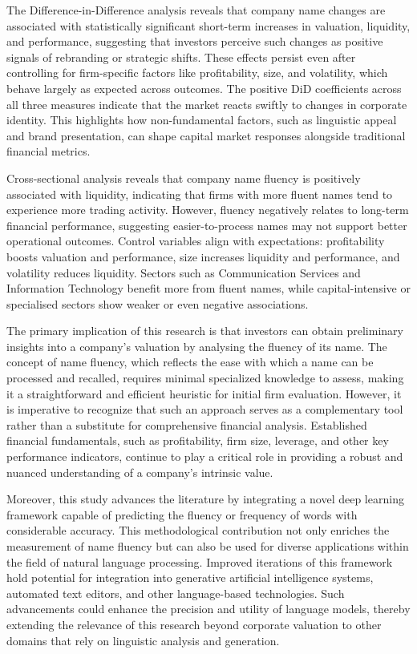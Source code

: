 \documentclass[a4paper,11pt]{report}
\begin{document}
The Difference-in-Difference analysis reveals that company name changes are associated with statistically significant short-term increases in valuation, liquidity, and performance, suggesting that investors perceive such changes as positive signals of rebranding or strategic shifts. These effects persist even after controlling for firm-specific factors like profitability, size, and volatility, which behave largely as expected across outcomes. The positive DiD coefficients across all three measures indicate that the market reacts swiftly to changes in corporate identity. This highlights how non-fundamental factors, such as linguistic appeal and brand presentation, can shape capital market responses alongside traditional financial metrics.

Cross-sectional analysis reveals that company name fluency is positively associated with liquidity, indicating that firms with more fluent names tend to experience more trading activity. However, fluency negatively relates to long-term financial performance, suggesting easier-to-process names may not support better operational outcomes. Control variables align with expectations: profitability boosts valuation and performance, size increases liquidity and performance, and volatility reduces liquidity. Sectors such as Communication Services and Information Technology benefit more from fluent names, while capital-intensive or specialised sectors show weaker or even negative associations.

The primary implication of this research is that investors can obtain preliminary insights into a company’s valuation by analysing the fluency of its name. The concept of name fluency, which reflects the ease with which a name can be processed and recalled, requires minimal specialized knowledge to assess, making it a straightforward and efficient heuristic for initial firm evaluation. However, it is imperative to recognize that such an approach serves as a complementary tool rather than a substitute for comprehensive financial analysis. Established financial fundamentals, such as profitability, firm size, leverage, and other key performance indicators, continue to play a critical role in providing a robust and nuanced understanding of a company’s intrinsic value.

Moreover, this study advances the literature by integrating a novel deep learning framework capable of predicting the fluency or frequency of words with considerable accuracy. This methodological contribution not only enriches the measurement of name fluency but can also be used for diverse applications within the field of natural language processing. Improved iterations of this framework hold potential for integration into generative artificial intelligence systems, automated text editors, and other language-based technologies. Such advancements could enhance the precision and utility of language models, thereby extending the relevance of this research beyond corporate valuation to other domains that rely on linguistic analysis and generation.
\end{document}
